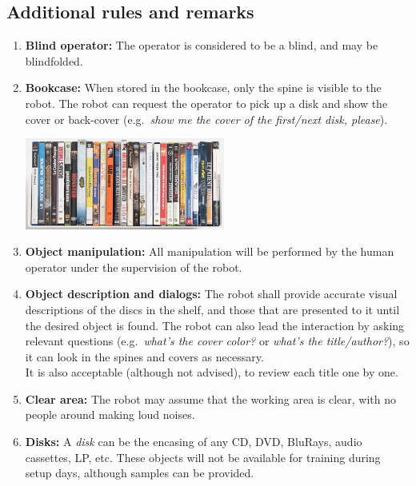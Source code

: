 %
%
\subsection{Additional rules and remarks}
\begin{enumerate}
	\item \textbf{Blind operator:} The operator is considered to be a blind, and may be blindfolded.

	\item \textbf{Bookcase:} When stored in the bookcase, only the spine is visible to the robot. The robot can request the operator to pick up a disk and show the cover or back-cover (e.g.~\textit{show me the cover of the first/next disk, please}).

	\begin{center}
	\includegraphics[width=\textwidth,height=3cm,keepaspectratio]{images/find_my_disk.png}
	\end{center}

	\item \textbf{Object manipulation:} All manipulation will be performed by the human operator under the supervision of the robot.

	\item \textbf{Object description and dialogs:} The robot shall provide accurate visual descriptions of the discs in the shelf, and those that are presented to it until the desired object is found. The robot can also lead the interaction by asking relevant questions (e.g.~\textit{what's the cover color?} or \textit{what's the title/author?}), so it can look in the spines and covers as necessary.\\
	It is also acceptable (although not advised), to review each title one by one.

	\item \textbf{Clear area:} The robot may assume that the working area is clear, with no people around making loud noises.

	\item \textbf{Disks:} A \textit{disk} can be the encasing of any CD, DVD, BluRays, audio cassettes, LP, etc. These objects will not be available for training during setup days, although samples can be provided.


\end{enumerate}

